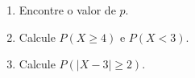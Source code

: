 \begin{enumerate}
    	\begin{enumerate}[label=\alph*)]
		\item Encontre o valor de $p$.
		\item Calcule $P (X \geq 4)$ e $P (X < 3)$.
		\item Calcule $P (|X − 3| \geq 2)$.
	\end{enumerate}
	\solv{}

\end{enumerate}




